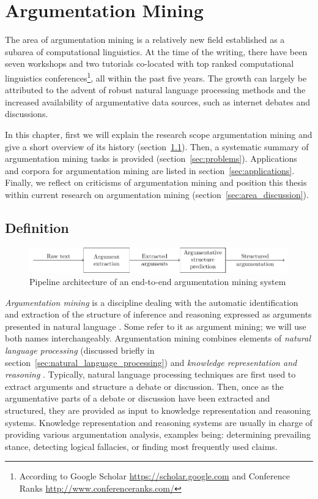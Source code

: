 \chapter{Argumentation Mining}
\label{chap:argmin}

The area of argumentation mining is a relatively new field established as a
subarea of computational linguistics.  At the time of the writing, there have
been seven workshops and two tutorials co-located with top ranked computational
linguistics conferences\footnote{According to Google Scholar
\url{https://scholar.google.com} and Conference Ranks
\url{http://www.conferenceranks.com/}}, all within the past five years. The
growth can largely be attributed to the advent of robust natural language
processing methods and the increased availability of argumentative data sources,
such as internet debates and discussions. 

In this chapter, first we will explain the research scope argumentation
mining and give a short overview of its history (section~\ref{sec:definition}).
Then, a systematic summary of argumentation mining tasks is provided
(section~\ref{sec:problems}). Applications and corpora for argumentation mining 
are listed in section~\ref{sec:applications}. 
Finally, we reflect on criticisms of argumentation mining
and position this thesis within current research on argumentation mining
(section~\ref{sec:area_discussion}).

\section{Definition}
\label{sec:definition}

\begin{figure}[t]
	\includegraphics{area_description_pipeline-figure0.pdf}
	\caption{Pipeline architecture of an end-to-end argumentation mining 
	system}
	\label{fig:pipeline}
\end{figure}

\emph{Argumentation mining} is a discipline dealing with the automatic
identification and extraction of the structure of inference and reasoning
expressed as arguments presented in natural language
\citep{lawrence2019argument}.  Some refer to it as argument mining; we will use
both names interchangeably.  Argumentation mining combines elements of
\emph{natural language processing} (discussed briefly in
section~\ref{sec:natural_language_processing}) and \emph{knowledge
representation and reasoning} \citep{cabrio2018five}.  Typically, natural
language processing techniques are first used to extract arguments and
structure a debate or discussion. Then, once as the argumentative parts of a
debate or discussion have been extracted and structured, they are provided as
input to knowledge representation and reasoning systems.  Knowledge
representation and reasoning systems are usually in charge of providing various
argumentation analysis, examples being: determining prevailing stance,
detecting logical fallacies, or finding most frequently used claims.


